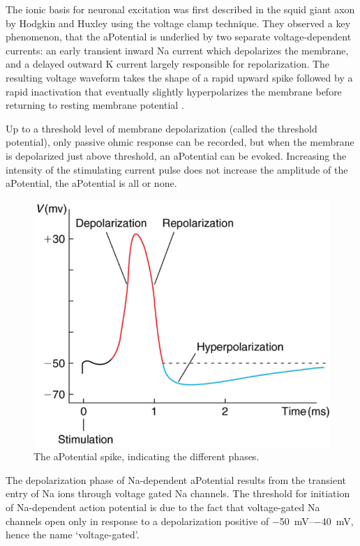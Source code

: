 \documentclass[../../Orator]{subfiles}
\begin{document}
The ionic basis for neuronal excitation was first described in the squid giant axon by Hodgkin and Huxley  using the voltage clamp technique. They observed a key phenomenon, that the \gls{aPotential} is underlied by two separate voltage-dependent currents: an early transient inward \gls{Na} current which depolarizes the membrane, and a delayed outward \gls{K} current largely responsible for repolarization. The resulting voltage waveform takes the shape of a rapid upward spike followed by a rapid inactivation that eventually slightly hyperpolarizes the membrane before returning to resting membrane potential .

Up to a threshold level of membrane depolarization (called the threshold potential), only passive ohmic response can be recorded, but when the membrane is depolarized just above threshold, an \gls{aPotential} can be evoked.  Increasing the intensity of the stimulating current pulse does not increase the amplitude of the \gls{aPotential},  the \gls{aPotential} is all or none. 
\begin{figure}[H]
    \centering
    \includegraphics[width=0.5\linewidth]{Pictures//Anakin/AP.png}
    \caption{The \gls{aPotential} spike, indicating the different phases.}
    \label{fig:AP}
\end{figure}

The depolarization phase of \gls{Na}-dependent \gls{aPotential} results from the transient entry of \gls{Na} ions through voltage gated \gls{Na} channels. The threshold  for initiation of \gls{Na}-dependent  action  potential is due to the fact that voltage-gated \gls{Na} channels open only  in  response  to  a  depolarization  positive  of \qtyrange{-50}{-40}{\mV}, hence the name `voltage-gated'. 
\end{document}
